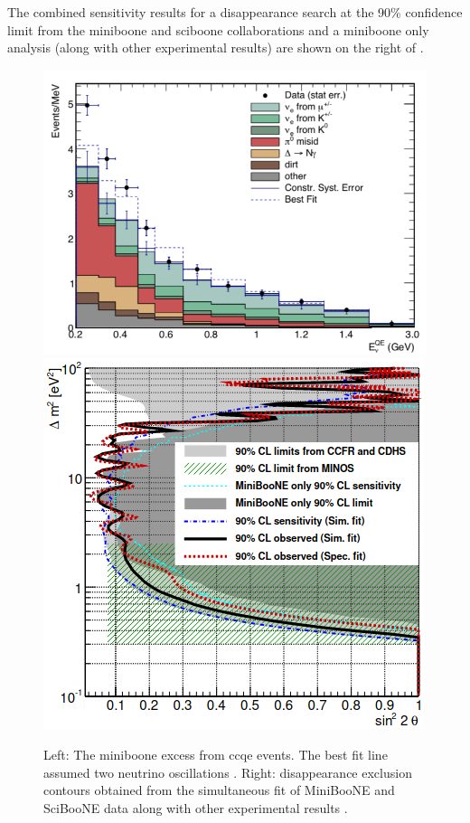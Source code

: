 The combined sensitivity results for a \numu disappearance search at the 90\% confidence limit from the \gls{miniboone} and \gls{sciboone} collaborations and a \gls{miniboone} only analysis (along with other experimental results) are shown on the right of  \cite{MiniBooNE/SciBooNE_numu_disapp_contour}.
\begin{figure}
    \centering
    \includegraphics[width = \smallfigwidth, height = 0.9\smallfigwidth]{figures-chap2/MiniBooNE_excess.png}
    \includegraphics[width = \smallfigwidth, height = 0.9\smallfigwidth]{figures-chap2/numu_disapp_MiniBooNE_SciBooNE.png}
    \caption[\gls{miniboone}  excess and the \numu disappearance sensitivites from a simultaneous fit of \gls{miniboone}  and \gls{sciboone}  data.]{Left: The \gls{miniboone} excess from \nue \gls{ccqe} events. The best fit line assumed two neutrino oscillations \cite{MiniBooNE_excess}. Right: \numu disappearance exclusion contours obtained from the simultaneous fit of MiniBooNE and SciBooNE data along with other experimental results \cite{MiniBooNE/SciBooNE_numu_disapp_contour}.}
    \label{fig:miniboone_sciboone}
\end{figure}

